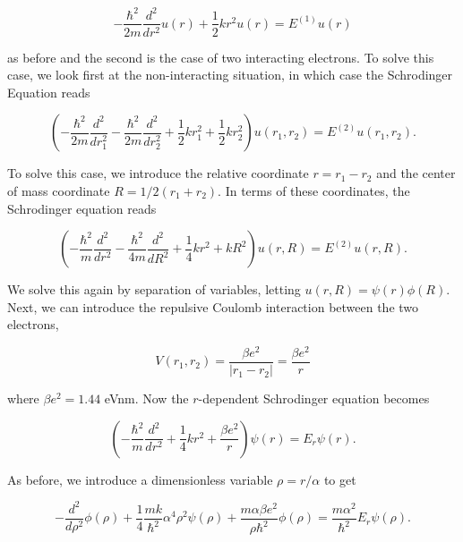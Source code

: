 \documentclass[12pt]{article}
\numberwithin{equation}{section}
\begin{document}
\begin{equation}
\label{eq:schrod1e}
-\frac{\hbar^{2}}{2m}\frac{d^{2}}{dr^{2}}u\left(r\right)+\frac{1}{2}kr^{2}u\left(r\right)=E^{\left(1\right)}u\left(r\right)
\end{equation}

\noindent as before and the second is the case of two interacting electrons.  To solve this case, we look first at the non-interacting situation, in which case the Schrodinger Equation reads

\begin{equation}
\label{eq:schrod2e}
\left(-\frac{\hbar^{2}}{2m}\frac{d^{2}}{dr_{1}^{2}}-\frac{\hbar^{2}}{2m}\frac{d^{2}}{dr_{2}^2}+\frac{1}{2}kr_{1}^2+\frac{1}{2}kr_{2}^2\right)u\left(r_{1},r_{2}\right)=E^{\left(2\right)}u\left(r_{1},r_{2}\right).
\end{equation}

\noindent To solve this case, we introduce the relative coordinate $r=r_{1}-r_{2}$ and the center of mass coordinate $R=1/2\left(r_{1}+r_{2}\right)$.  In terms of these coordinates, the Schrodinger equation reads

\begin{equation}
\left(-\frac{\hbar^{2}}{m}\frac{d^{2}}{dr^{2}}-\frac{\hbar^{2}}{4m}\frac{d^{2}}{dR^{2}}+\frac{1}{4}kr^{2}+kR^{2}\right)u\left(r,R\right)=E^{\left(2\right)}u\left(r,R\right).
\end{equation}

\noindent We solve this again by separation of variables, letting $u\left(r,R\right)=\psi\left(r\right)\phi\left(R\right)$.  
\\\indent Next, we can introduce the repulsive Coulomb interaction between the two electrons,

\begin{equation}
\label{eq:coulombrep}
V\left(r_{1},r_{2}\right)=\frac{\beta e^{2}}{|r_{1}-r_{2}|}=\frac{\beta e^{2}}{r}
\end{equation}

\noindent where $\beta e^{2}=1.44$ eVnm.  Now the $r$-dependent Schrodinger equation becomes

$$\left(-\frac{\hbar^{2}}{m}\frac{d^{2}}{dr^{2}}+\frac{1}{4}kr^{2}+\frac{\beta e^{2}}{r}\right)\psi\left(r\right)=E_{r}\psi\left(r\right).$$

\noindent As before, we introduce a dimensionless variable $\rho = r/\alpha$ to get

$$-\frac{d^{2}}{d\rho^{2}}\phi\left(\rho\right)+\frac{1}{4}\frac{mk}{\hbar^{2}}\alpha^{4}\rho^{2}\psi\left(\rho\right)+\frac{m\alpha\beta e^{2}}{\rho\hbar^{2}}\phi\left(\rho\right)=\frac{m\alpha^{2}}{\hbar^{2}}E_{r}\psi\left(\rho\right).$$
\end{document}
